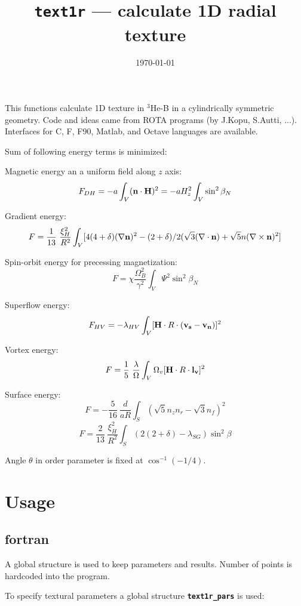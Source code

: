 \documentclass[a4paper]{article}
\begin{document}
\title{{\tt text1r} --- calculate 1D radial texture}
\date{\today}
\author{}
\maketitle

\def\sp{\sqrt{5}}
\def\st{\sqrt{3}}
\def\ddd#1#2{\frac{\partial #1}{\partial #2}}

This functions calculate 1D texture in $^3$He-B in a cylindrically
symmetric geometry. Code and ideas came from ROTA programs (by J.Kopu,
S.Autti, ...). Interfaces for C, F, F90, Matlab, and Octave languages
are available.

Sum of following energy terms is minimized:

\def\bn{{\bf n}}
\def\bH{{\bf H}}
\def\divn{(\nabla\cdot\bn)}
\def\rotn{(\nabla\times\bn)}
\def\grn{\nabla\bn}
Magnetic energy an a uniform field along $z$ axis:
$$
F_{DH} = - a \int_V (\bn\cdot\bH)^2 = -a H_z^2 \int_V \sin^2\beta_N
$$

Gradient energy:
$$
F = \frac{1}{13}\ \frac{\xi_H^2}{R^2}\int_V  [ 4 (4+\delta) (\grn)^2
  - (2+\delta) / 2  (\st \divn + \sp n \rotn^2 ]
$$

Spin-orbit energy for precessing magnetization:
$$
F = \chi \frac{\Omega^2_B}{\gamma^2} \int_V  \Psi^2 \sin^2\beta_N
$$

Superflow energy:
$$
F_{HV} = - \lambda_{HV} \int_V [\bH \cdot R \cdot ({\bf v_s-v_n})]^2
$$

Vortex energy:
$$
F = \frac15\ \frac{\lambda}{\Omega} \int_V  \Omega_v [\bH \cdot R \cdot {\bf l_v}]^2
$$

Surface energy:
$$
F = - \frac{5}{16}\ \frac{d}{aR} \int_S (\sp n_z n_r - \st n_f)^2
$$
$$
F = \frac{2}{13}\ \frac{\xi_H^2}{R^2} \int_S ( 2 (2 + \delta) - \lambda_{SG})  \sin^2\beta
$$

Angle $\theta$ in order parameter is fixed at $\cos^{-1}(-1/4)$.


\section*{Usage}

\subsection*{fortran}

A global structure is used to keep parameters and results. Number of points is
hardcoded into the program.


To specify textural parameters a global structure {\tt\bf text1r\_pars}
is used:
\end{document}
